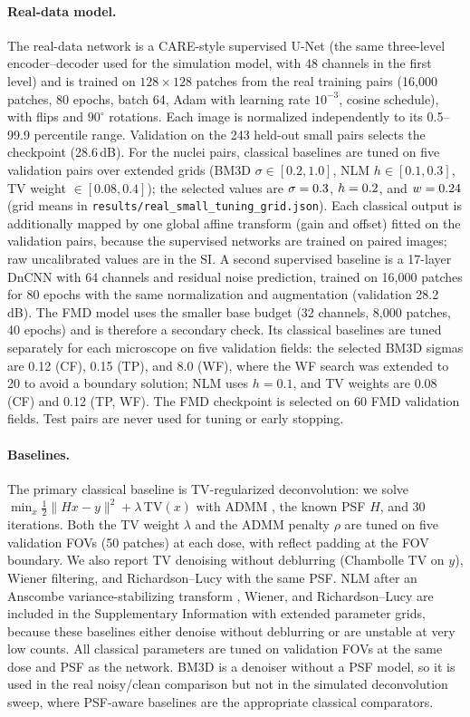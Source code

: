 \documentclass[10pt]{article}
\begin{document}
\paragraph{Real-data model.}
The real-data network is a CARE-style supervised U-Net (the same three-level
encoder--decoder used for the simulation model, with 48 channels in the first
level) and is trained on $128\times128$ patches from the real training pairs
(16{,}000 patches, 80 epochs, batch 64, Adam with learning rate $10^{-3}$,
cosine schedule), with flips and $90^\circ$ rotations. Each image is normalized
independently to its 0.5--99.9 percentile range. Validation on the 243 held-out
small pairs selects the checkpoint (28.6\,dB). For the nuclei pairs, classical baselines are tuned
on five validation pairs over extended grids (BM3D \cite{dabov2007}
$\sigma\in[0.2,1.0]$, NLM
$h\in[0.1,0.3]$, TV weight $\in[0.08,0.4]$); the selected values are
$\sigma=0.3$, $h=0.2$, and $w=0.24$ (grid means in
\texttt{results/real\_small\_tuning\_grid.json}). Each classical output is
additionally mapped by one global affine transform (gain and offset) fitted on
the validation pairs, because the supervised networks are trained on paired
images; raw uncalibrated values are in the SI. A second supervised baseline
is a 17-layer DnCNN \cite{zhang2017dncnn} with 64 channels and residual noise
prediction, trained on 16{,}000 patches for 80 epochs with the same
normalization and augmentation (validation 28.2\,dB). The FMD model uses the smaller base budget (32
channels, 8{,}000 patches, 40 epochs) and is therefore a secondary check.
Its classical baselines are tuned separately for each microscope on five
validation fields: the selected BM3D sigmas are 0.12 (CF), 0.15 (TP), and 8.0
(WF), where the WF search was extended to 20 to avoid a boundary solution; NLM
uses $h=0.1$, and TV weights are 0.08 (CF) and 0.12 (TP, WF). The FMD
checkpoint is selected on 60 FMD validation fields. Test pairs are never used
for tuning or early stopping.

\paragraph{Baselines.}
The primary classical baseline is TV-regularized deconvolution: we solve
$\min_x \tfrac12\|Hx-y\|^2+\lambda\,\mathrm{TV}(x)$ with ADMM
\cite{boyd2011}, the known PSF $H$, and 30 iterations. Both the TV weight
$\lambda$ and the ADMM penalty $\rho$ are tuned on five validation FOVs
(50 patches) at each dose, with reflect padding at the FOV boundary. We
also report TV denoising without deblurring (Chambolle TV on $y$), Wiener
filtering, and Richardson--Lucy with the same PSF. NLM after an Anscombe
variance-stabilizing transform \cite{anscombe1948,makitalo2011}, Wiener, and
Richardson--Lucy are included in the
Supplementary Information with extended parameter grids, because these
baselines either denoise without deblurring or are unstable at very low counts.
All classical parameters are tuned on validation FOVs at the same dose and PSF
as the network. BM3D is a denoiser without a PSF model, so it is used in the
real noisy/clean comparison but not in the simulated deconvolution sweep, where
PSF-aware baselines are the appropriate classical comparators.
\end{document}

